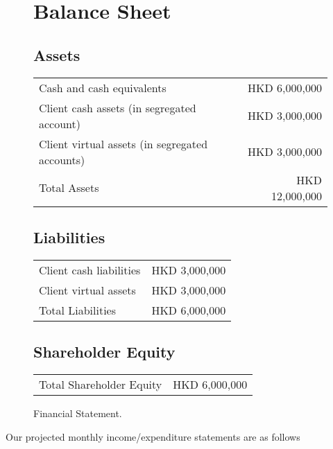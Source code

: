\begin{figure}[h]
  \centering
  \caption{Financial Statement.}
  \label{fig:financial_statement}
  
  \section*{Balance Sheet}
  
  \subsection*{Assets}
  \begin{tabular}{lr}
    Cash and cash equivalents & HKD 6,000,000 \\
    Client cash assets (in segregated account) & HKD 3,000,000 \\
    Client virtual assets (in segregated accounts) & HKD 3,000,000 \\
    \midrule
    Total Assets & HKD 12,000,000 \\
  \end{tabular}
  
  \subsection*{Liabilities}
  \begin{tabular}{lr}
    Client cash liabilities & HKD 3,000,000 \\
    Client virtual assets & HKD 3,000,000 \\
    \midrule
    Total Liabilities & HKD 6,000,000 \\
  \end{tabular}
  
  \subsection*{Shareholder Equity}
  \begin{tabular}{lr}
    Total Shareholder Equity & HKD 6,000,000 \\
  \end{tabular}  
\end{figure}

Our projected monthly income/expenditure statements are as follows

